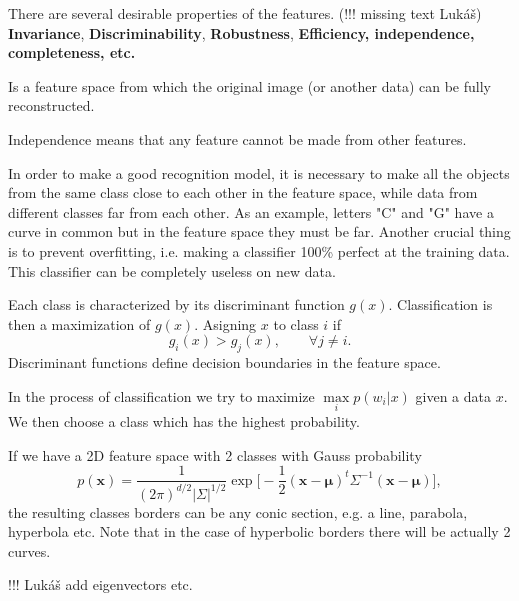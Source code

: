 There are several desirable properties of the features. (!!! missing text Lukáš) \textbf{Invariance}, \textbf{Discriminability}, \textbf{Robustness}, \textbf{Efficiency, independence, completeness, etc.}

\begin{define}
  Is a feature space from which the original image (or another data) can be fully reconstructed.
\end{define}


\begin{define}[Independence]
  Independence means that any feature cannot be made from other features.
\end{define}

In order to make a good recognition model, it is necessary to make all the objects from the same class close to each other in the feature space, while data from different classes far from each other. As an example, letters "C" and "G" have a curve in common but in the feature space they must be far. Another crucial thing is to prevent overfitting, i.e. making a classifier 100\% perfect at the training data. This classifier can be completely useless on new data.

Each class is characterized by its discriminant function $g(x)$. Classification is then a maximization of $g(x)$. Asigning $x$ to class $i$ if
$$ g_i(x) > g_j(x),\qquad \forall j\neq i.$$
Discriminant functions define decision boundaries in the feature space.

In the process of classification we try to maximize $\max\limits_{i} p(w_i|x)$ given a data $x$. We then choose a class which has the highest probability.

\begin{example}
If we have a 2D feature space with 2 classes with Gauss probability
$$  p(\textbf{x})=\frac{1}{(2\pi)^{d/2}|\Sigma|^{1/2}}\exp\Big[ -\frac{1}{2}(\textbf{x}-\boldsymbol{\mu})^t\Sigma^{-1}(\textbf{x}-\boldsymbol{\mu}) \Big],$$ the resulting classes borders can be any conic section, e.g. a line, parabola, hyperbola etc. Note that in the case of hyperbolic borders there will be actually 2 curves.
\end{example}

!!! Lukáš add eigenvectors etc.

